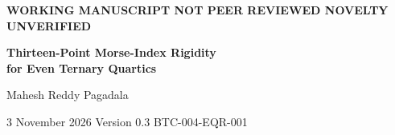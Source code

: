 \documentclass[10pt,a4paper]{article}
\theoremstyle{plain}
\theoremstyle{remark}
\newcommand{\RP}{\mathbb{RP}}
\begin{document}
\begin{center}
{\small\bfseries\color{muted} WORKING MANUSCRIPT \textemdash{} NOT PEER REVIEWED \textemdash{} NOVELTY UNVERIFIED}\par\vspace{6pt}
{\LARGE\bfseries\color{ink} Thirteen-Point Morse-Index Rigidity\\[4pt] for Even Ternary Quartics}\par\vspace{9pt}
{\large Mahesh Reddy Pagadala}\par\vspace{4pt}
{\small 3 November 2026 \quad\textbar\quad Version 0.3 \quad\textbar\quad BTC-004-EQR-001}\par
\end{center}
\vspace{4pt}
\begin{abstract}
Let $f$ be a real homogeneous ternary quartic containing only monomials even in each coordinate, with arbitrary coefficients. We prove that, if its normalized function on $\RP^2$ is Morse and has thirteen distinct real critical points, then its Morse-index counts $(m_0,m_1,m_2)$ are necessarily $(4,6,3)$ or $(3,6,4)$; both occur. The proof passes to squared coordinates on the standard two-simplex, where the function becomes quadratic. A determinant identity relates the edge curvature, transverse derivative and interior Hessian and yields an exhaustive index classification. The conclusion excludes four other arithmetically admissible thirteen-point triples \emph{within this even-power family}; it makes no assertion of impossibility for general ternary quartics. This manuscript is an internal, AI-assisted research draft. Independent human review and comprehensive prior-art verification remain outstanding.
\end{abstract}
\end{document}
